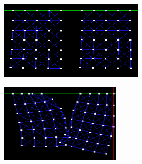 \begin{figure}[H]
\centering
\begin{minipage}[t]{.45\textwidth}
  \centering
  \includegraphics[height=4cm]{img/curtain.png}
  \label{fig:flag3}
\end{minipage}\hfill
\begin{minipage}[t]{.45\textwidth}
  \centering
  \includegraphics[height=4cm]{img/curtain2.png}
  \label{fig:flag4}
\end{minipage}
\end{figure}




